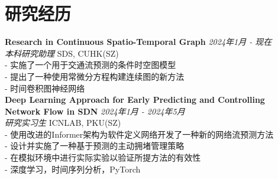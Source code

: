 \documentclass[a4paper,10pt]{article}
\begin{document}
\section*{研究经历}
\textbf{Research in Continuous Spatio-Temporal Graph} \hfill \textit{2024年1月 - 现在}\\
\textit{本科研究助理} \hfill SDS, CUHK(SZ)\\
- 实施了一个用于交通流预测的条件时空图模型\\
- 提出了一种使用常微分方程构建连续图的新方法\\
- 时间卷积图神经网络\\
\textbf{Deep Learning Approach for Early Predicting and Controlling Network Flow in SDN} \hfill \textit{2024年1月 - 2024年5月}\\
\textit{研究实习生} \hfill ICNLAB, PKU(SZ)\\
- 使用改进的Informer架构为软件定义网络开发了一种新的网络流预测方法\\
- 设计并实施了一种基于预测的主动拥堵管理策略\\
- 在模拟环境中进行实际实验以验证所提方法的有效性\\
- 深度学习，时间序列分析，PyTorch
\end{document}
